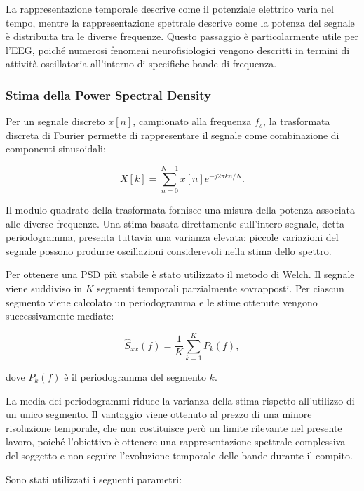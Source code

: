 La rappresentazione temporale descrive come il potenziale elettrico
varia nel tempo, mentre la rappresentazione spettrale descrive come
la potenza del segnale è distribuita tra le diverse frequenze. Questo
passaggio è particolarmente utile per l'EEG, poiché numerosi fenomeni
neurofisiologici vengono descritti in termini di attività oscillatoria
all'interno di specifiche bande di frequenza.


\subsubsection{Stima della Power Spectral Density}

Per un segnale discreto $x[n]$, campionato alla frequenza $f_s$, la
trasformata discreta di Fourier permette di rappresentare il segnale
come combinazione di componenti sinusoidali:

\begin{equation}
	X[k]
	=
	\sum_{n=0}^{N-1}
	x[n]
	e^{-j2\pi kn/N}.
\end{equation}

Il modulo quadrato della trasformata fornisce una misura della potenza
associata alle diverse frequenze. Una stima basata direttamente
sull'intero segnale, detta periodogramma, presenta tuttavia una
varianza elevata: piccole variazioni del segnale possono produrre
oscillazioni considerevoli nella stima dello spettro.

Per ottenere una PSD più stabile è stato utilizzato il metodo di
Welch. Il segnale viene suddiviso in $K$ segmenti temporali
parzialmente sovrapposti. Per ciascun segmento viene calcolato un
periodogramma e le stime ottenute vengono successivamente mediate:

\begin{equation}
	\widehat{S}_{xx}(f)
	=
	\frac{1}{K}
	\sum_{k=1}^{K}
	P_k(f),
\end{equation}

dove $P_k(f)$ è il periodogramma del segmento $k$.

La media dei periodogrammi riduce la varianza della stima rispetto
all'utilizzo di un unico segmento. Il vantaggio viene ottenuto al
prezzo di una minore risoluzione temporale, che non costituisce però
un limite rilevante nel presente lavoro, poiché l'obiettivo è ottenere
una rappresentazione spettrale complessiva del soggetto e non seguire
l'evoluzione temporale delle bande durante il compito.

Sono stati utilizzati i seguenti parametri:

